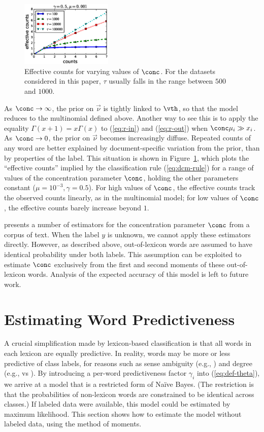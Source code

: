 \begin{figure}
\centering
\includegraphics[width=0.39\textwidth]{effective-counts.eps}
\caption{Effective counts for varying values of $\conc$. For the datasets considered in this paper, $\tau$ usually falls in the range between $500$ and $1000$.}
\label{fig:effective-counts}
\end{figure}

As $\conc \to \infty$, the prior on $\vec{\nu}$ is tightly linked to $\vth$, so that the model reduces to the multinomial defined above. Another way to see this is to apply the equality $\Gamma(x+1) = x\Gamma(x)$ to (\ref{eq:r-in}) and (\ref{eq:r-out}) when $\conc\mu_i \gg x_i$. As $\conc \to 0$, the prior on $\vec{\nu}$ becomes increasingly diffuse. Repeated counts of any word are better explained by document-specific variation from the prior, than by properties of the label. This situation is shown in Figure~\ref{fig:effective-counts}, which plots the ``effective counts'' implied by the classification rule (\ref{eq:dcm-rule}) for a range of values of the concentration parameter $\conc$, holding the other parameters constant ($\mu = 10^{-3}, \gamma = 0.5$). For high values of $\conc$, the effective counts track the observed counts linearly, as in the multinomial model; for low values of $\conc$, the effective counts barely increase beyond $1$.

 presents a number of estimators for the concentration parameter $\conc$ from a corpus of text. When the label $y$ is unknown, we cannot apply these estimators directly. However, as described above, out-of-lexicon words are assumed to have identical probability under both labels. This assumption can be exploited to estimate $\conc$ exclusively from the first and second moments of these out-of-lexicon words. Analysis of the expected accuracy of this model is left to future work.

\section{Estimating Word Predictiveness}
A crucial simplification made by lexicon-based classification is that all words in each lexicon are equally predictive. In reality, words may be more or less predictive of class labels, for reasons such as sense ambiguity (e.g., ) and degree (e.g.,  vs ). By introducing a per-word predictiveness factor $\gamma_i$ into (\ref{eq:def-theta}), we arrive at a model that is a restricted form of Na\"ive Bayes. (The restriction is that the probabilities of non-lexicon words are constrained to be identical across classes.) If labeled data were available, this model could be estimated by maximum likelihood. This section shows how to estimate the model without labeled data, using the method of moments.

